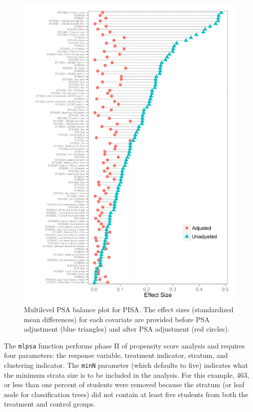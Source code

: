 \documentclass[letterpaper,12p,twoside]{article} %
\begin{document}
\begin{figure}[h!]
\begin{center}
\includegraphics[height=.90\textheight]{../Figures/pisabalance.pdf}
\caption[Multilevel PSA balance plot for PISA]{Multilevel PSA balance plot for PISA. The effect sizes (standardized mean differences) for each covariate are provided before PSA adjustment (blue triangles) and after PSA adjustment (red circles).}
\end{center}
\end{figure}

\clearpage

The \texttt{mlpsa} function performs phase II of propensity score analysis and requires four parameters: the response variable, treatment indicator, stratum, and clustering indicator. The \texttt{minN} parameter (which defaults to five) indicates what the minimum strata size is to be included in the analysis. For this example, 463, or less than one percent of students were removed because the stratum (or leaf node for classification trees) did not contain at least five students from both the treatment and control groups.
\end{document}
